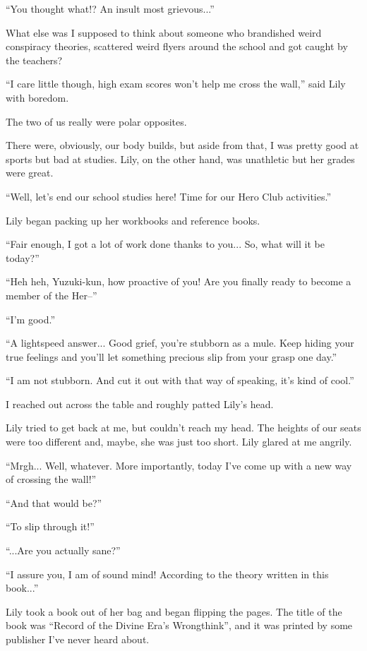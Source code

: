``You thought what!? An insult most grievous...''

What else was I supposed to think about someone who brandished weird conspiracy theories, scattered weird flyers around the school and got caught by the teachers?

``I care little though, high exam scores won't help me cross the wall,'' said Lily with boredom.

The two of us really were polar opposites.

There were, obviously, our body builds, but aside from that, I was pretty good at sports but bad at studies. Lily, on the other hand, was unathletic but her grades were great.

``Well, let's end our school studies here! Time for our Hero Club activities.''

Lily began packing up her workbooks and reference books.

``Fair enough, I got a lot of work done thanks to you... So, what will it be today?''

``Heh heh, Yuzuki-kun, how proactive of you! Are you finally ready to become a member of the Her--''

``I'm good.''

``A lightspeed answer... Good grief, you're stubborn as a mule. Keep hiding your true feelings and you'll let something precious slip from your grasp one day.''

``I am not stubborn. And cut it out with that way of speaking, it's kind of cool.''

I reached out across the table and roughly patted Lily's head.

Lily tried to get back at me, but couldn't reach my head. The heights of our seats were too different and, maybe, she was just too short. Lily glared at me angrily.

``Mrgh... Well, whatever. More importantly, today I've come up with a new way of crossing the wall!''

``And that would be?''

``To slip through it!''

``...Are you actually sane?''

``I assure you, I am of sound mind! According to the theory written in this book...''

Lily took a book out of her bag and began flipping the pages. The title of the book was ``Record of the Divine Era's Wrongthink'', and it was printed by some publisher I've never heard about.

